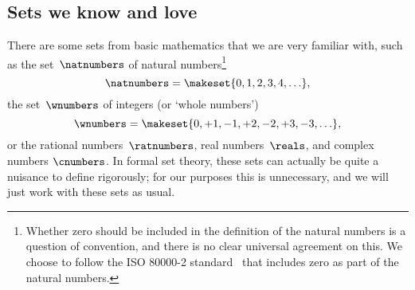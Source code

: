 \subsection{Sets we know and love}

There are some sets from basic mathematics that we are very familiar with, such as
the set~$\natnumbers$ of natural numbers\footnote{
    Whether zero should be included in the definition of the natural numbers is a question of convention, and there is no clear universal agreement on this.
    We choose to follow the ISO 80000-2 standard~\cite{ISO:2009:IQU} that includes zero as part of the natural numbers.
}
%
\begin{equation}
    \natnumbers = \makeset{0, 1, 2, 3, 4, \ldots },
\end{equation}
%
the set~$\wnumbers$ of integers (or `whole numbers')
\begin{equation}
    \wnumbers = \makeset{ 0, +1, -1, +2, -2, +3, -3, \ldots},
\end{equation}
%
or the rational numbers~$\ratnumbers$, real numbers~$\reals$, and complex numbers $\cnumbers$.
In formal set theory, these sets can actually be quite a nuisance to define rigorously; for our purposes this is unnecessary, and we will just work with these sets as usual.

